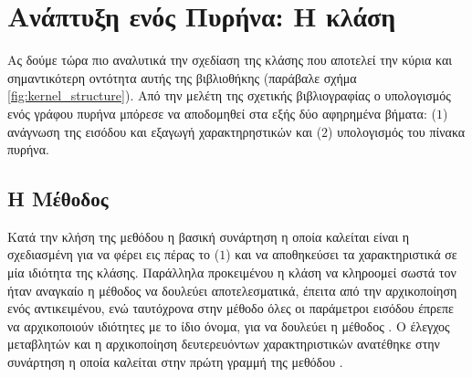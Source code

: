 \section{Ανάπτυξη ενός Πυρήνα: Η κλάση }
Ας δούμε τώρα πιο αναλυτικά την σχεδίαση της κλάσης  που αποτελεί την κύρια και σημαντικότερη οντότητα αυτής της βιβλιοθήκης (παράβαλε σχήμα \ref{fig:kernel_structure}).
Από την μελέτη της σχετικής βιβλιογραφίας ο υπολογισμός ενός γράφου πυρήνα μπόρεσε να αποδομηθεί στα εξής δύο αφηρημένα βήματα:  ($1$) ανάγνωση της εισόδου και εξαγωγή χαρακτηρηστικών και ($2$) υπολογισμός του πίνακα πυρήνα.
\subsection{Η Μέθοδος \texttt{}}
Κατά την κλήση της μεθόδου \texttt{} η βασική συνάρτηση η οποία καλείται είναι η \texttt{} σχεδιασμένη για να φέρει εις πέρας το ($1$) και να αποθηκεύσει τα χαρακτηριστικά σε μία ιδιότητα της κλάσης.
Παράλληλα προκειμένου η κλάση  να κληροομεί σωστά τον  ήταν αναγκαίο η μέθοδος  να δουλεύει αποτελεσματικά, έπειτα από την αρχικοποίηση ενός αντικειμένου, ενώ ταυτόχρονα στην μέθοδο   όλες οι παράμετροι εισόδου έπρεπε να αρχικοποιούν ιδιότητες με το ίδιο όνομα, για να δουλεύει η μέθοδος .
Ο έλεγχος μεταβλητών και η αρχικοποίηση δευτερευόντων χαρακτηριστικών ανατέθηκε στην συνάρτηση \texttt{} η οποία καλείται στην πρώτη γραμμή της μεθόδου \texttt{}.

